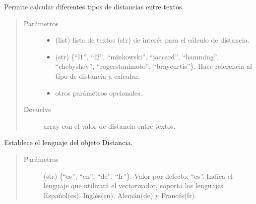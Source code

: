 \documentclass[letterpaper,10pt,openany,spanish]{sphinxmanual}
\begin{document}
\begin{fulllineitems}
\begin{fulllineitems}
\label{\detokenize{funciones/comparacion:comparacion.Distancia.distancia_pares}}
Permite calcular diferentes tipos de distancias entre textos.
\begin{quote}\begin{description}
\item[{Parámetros}] \leavevmode\begin{itemize}
\item {} 
 \textendash{} (list) lista de textos (str) de interés para el 
cálculo de distancia.

\item {} 
 \textendash{} (str) \{“l1”, “l2”, “minkowski”, “jaccard”, 
“hamming”, “chebyshev”, “rogerstanimoto”, “braycurtis”\}. 
Hace referencia al tipo de distancia a calcular.

\item {} 
 \textendash{} otros parámetros opcionales.

\end{itemize}

\item[{Devuelve}] \leavevmode
array con el valor de distancia entre textos.

\end{description}\end{quote}

\end{fulllineitems}


\begin{fulllineitems}
\label{\detokenize{funciones/comparacion:comparacion.Distancia.establecer_lenguaje}}
Establece el lenguaje del objeto Distancia.
\begin{quote}\begin{description}
\item[{Parámetros}] \leavevmode
{} \textendash{} (str) \{“es”, “en”, “de”, “fr”\}. 
Valor por defecto: “es”. Indica el lenguaje que utilizará el 
vectorizador, soporta los lenguajes Español(es), Inglés(en), 
Alemán(de) y Francés(fr).


\end{description}
\end{quote}
\end{fulllineitems}
\end{fulllineitems}
\end{document}
